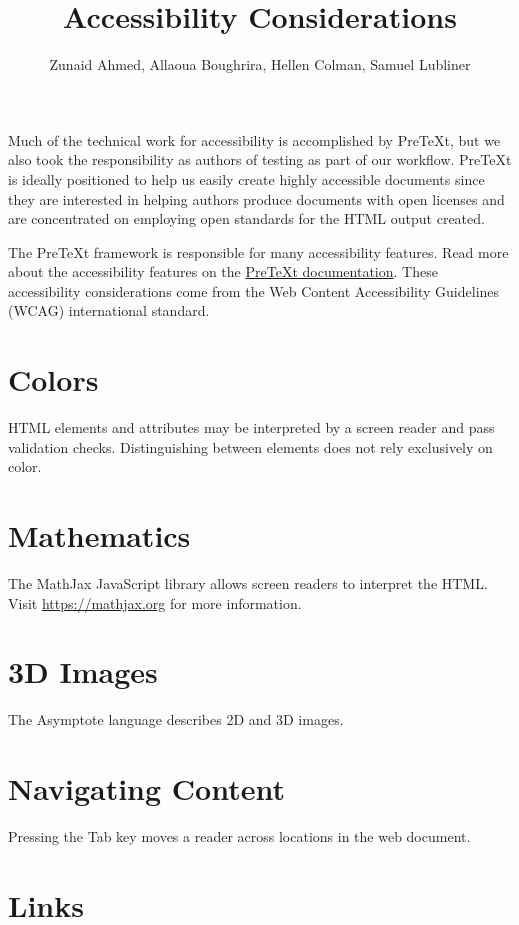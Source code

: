 \documentclass{article}
\title{Accessibility Considerations}
\author{Zunaid Ahmed, Allaoua Boughrira, Hellen Colman, Samuel Lubliner}
\begin{document}
\maketitle

Much of the technical work for accessibility is accomplished by PreTeXt, but we also took the responsibility as authors of testing as part of our workflow. PreTeXt is ideally positioned to help us easily create highly accessible documents since they are interested in helping authors produce documents with open licenses and are concentrated on employing open standards for the HTML output created.

The PreTeXt framework is responsible for many accessibility features. Read more about the accessibility features on the \href{https://pretextbook.org/doc/guide/html/topic-accessibility.html}{PreTeXt documentation}. These accessibility considerations come from the Web Content Accessibility Guidelines (WCAG) international standard.

\section{Colors}

HTML elements and attributes may be interpreted by a screen reader and pass validation checks. Distinguishing between elements does not rely exclusively on color.

\section{Mathematics}

The MathJax JavaScript library allows screen readers to interpret the HTML. Visit \url{https://mathjax.org} for more information.

\section{3D Images}

The Asymptote language describes 2D and 3D images.

\section{Navigating Content}

Pressing the Tab key moves a reader across locations in the web document.

\section{Links}
\end{document}
